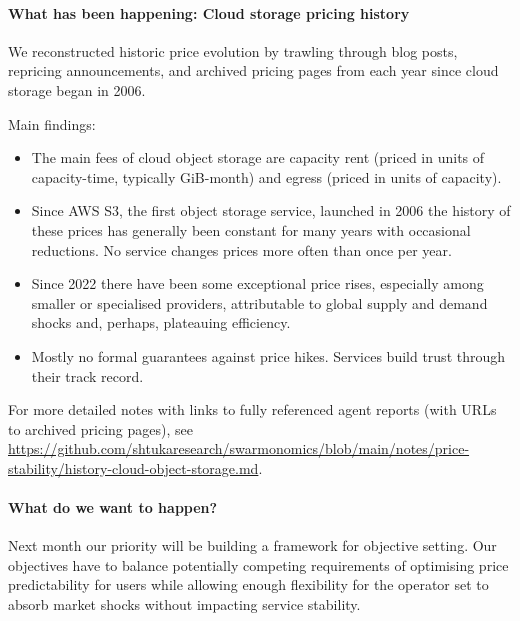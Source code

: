 \paragraph{What has been happening: Cloud storage pricing history}
%
We reconstructed historic price evolution by trawling through blog posts, repricing announcements, and archived pricing pages from each year since cloud storage began in 2006.

Main findings:
\begin{itemize}
\item The main fees of cloud object storage are capacity rent (priced in units of capacity-time, typically GiB-month) and egress (priced in units of capacity).
\item Since AWS S3, the first object storage service, launched in 2006 the history of these prices has generally been constant for many years with occasional reductions. No service changes prices more often than once per year.
\item Since 2022 there have been some exceptional price rises, especially among smaller or specialised providers, attributable to global supply and demand shocks and, perhaps, plateauing efficiency.
\item Mostly no formal guarantees against price hikes. Services build trust through their track record.
\end{itemize}

For more detailed notes with links to fully referenced agent reports (with URLs to archived pricing pages), see \url{https://github.com/shtukaresearch/swarmonomics/blob/main/notes/price-stability/history-cloud-object-storage.md}.

\paragraph{What do we want to happen?}

Next month our priority will be building a framework for objective setting.
%
Our objectives have to balance potentially competing requirements of optimising price predictability for users while allowing enough flexibility for the operator set to absorb market shocks without impacting service stability.

